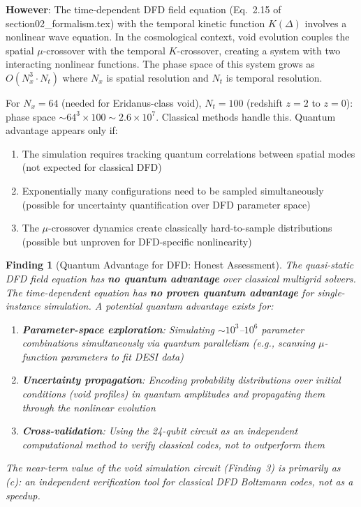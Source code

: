 \documentclass[11pt]{article}
\newtheorem{finding}[theorem]{Finding}
\theoremstyle{definition}
\theoremstyle{remark}
\newcommand{\ee}[1]{\times 10^{#1}}
\begin{document}
\textbf{However}: The time-dependent DFD field equation (Eq.~2.15 of
section02\_formalism.tex) with the temporal kinetic function $K(\Delta)$
involves a nonlinear wave equation.  In the cosmological context, void
evolution couples the spatial $\mu$-crossover with the temporal $K$-crossover,
creating a system with two interacting nonlinear functions.  The phase space
of this system grows as $O(N_x^3 \cdot N_t)$ where $N_x$ is spatial
resolution and $N_t$ is temporal resolution.

For $N_x = 64$ (needed for Eridanus-class void), $N_t = 100$ (redshift
$z = 2$ to $z = 0$): phase space $\sim 64^3 \times 100 \sim 2.6\ee{7}$.
Classical methods handle this.  Quantum advantage appears only if:
\begin{enumerate}[nosep]
  \item The simulation requires tracking quantum correlations between
    spatial modes (not expected for classical DFD)
  \item Exponentially many configurations need to be sampled simultaneously
    (possible for uncertainty quantification over DFD parameter space)
  \item The $\mu$-crossover dynamics create classically hard-to-sample
    distributions (possible but unproven for DFD-specific nonlinearity)
\end{enumerate}

\begin{finding}[Quantum Advantage for DFD: Honest Assessment]
\label{finding:quantum-advantage-dfd}
The quasi-static DFD field equation has \textbf{no quantum advantage}
over classical multigrid solvers.  The time-dependent equation has
\textbf{no proven quantum advantage} for single-instance simulation.
A \emph{potential} quantum advantage exists for:
\begin{enumerate}[nosep]
  \item \textbf{Parameter-space exploration}: Simulating $\sim 10^3$--$10^6$
    parameter combinations simultaneously via quantum parallelism (e.g.,
    scanning $\mu$-function parameters to fit DESI data)
  \item \textbf{Uncertainty propagation}: Encoding probability distributions
    over initial conditions (void profiles) in quantum amplitudes and
    propagating them through the nonlinear evolution
  \item \textbf{Cross-validation}: Using the 24-qubit circuit as an
    independent computational method to verify classical codes, not to
    outperform them
\end{enumerate}
The near-term value of the void simulation circuit (Finding~3) is primarily
as (c): an independent verification tool for classical DFD Boltzmann codes,
not as a speedup.
\end{finding}
\end{document}
